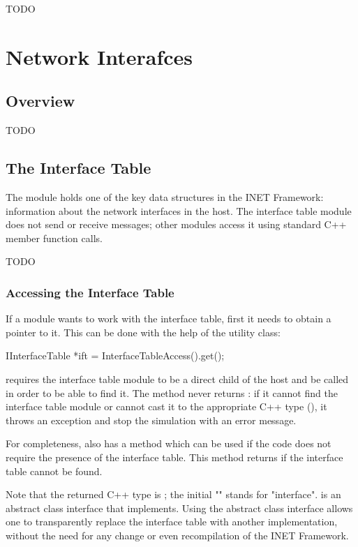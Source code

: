\ifdraft TODO

\chapter{Network Interafces}
\label{cha:network-interfaces}

\section{Overview}

TODO

\section{The Interface Table}

The  module holds one of the key data structures in
the INET Framework: information about the network interfaces in the host.
The interface table module does not send or receive messages; other modules
access it using standard C++ member function calls.

\ifdraft TODO
\subsection{Accessing the Interface Table}

If a module wants to work with the interface table, first it needs to obtain a
pointer to it. This can be done with the help of the
 utility class:

\begin{cpp}
IInterfaceTable *ift = InterfaceTableAccess().get();
\end{cpp}

 requires the interface table module to be a
direct child of the host and be called  in order to
be able to find it. The  method never returns : if
it cannot find the interface table module or cannot cast it to the
appropriate C++ type (), it throws an exception
and stop the simulation with an error message.

For completeness,  also has a
 method which can be used if the code does not require
the presence of the interface table. This method returns  if the
interface table cannot be found.

Note that the returned C++ type is ; the initial
"" stands for "interface".  is an abstract
class interface that  implements. Using the abstract
class interface allows one to transparently replace the interface table with
another implementation, without the need for any change or even
recompilation of the INET Framework.
\fi


